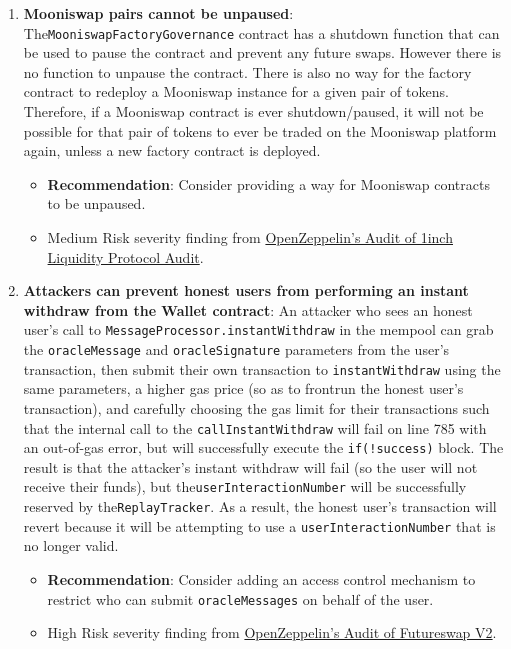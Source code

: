 \begin{enumerate}
\item\textbf{Mooniswap pairs cannot be unpaused}: The\linebreak\verb|MooniswapFactoryGovernance| contract has a shutdown function that can be used to pause the contract and prevent any future swaps. However there is no function to unpause the contract. There is also no way for the factory contract to redeploy a Mooniswap instance for a given pair of tokens. Therefore, if a Mooniswap contract is ever shutdown/paused, it will not be possible for that pair of tokens to ever be traded on the Mooniswap platform again, unless a new factory contract is deployed.
	\begin{itemize}
	\item\textbf{Recommendation}: Consider providing a way for Mooniswap contracts to be unpaused.
	\item Medium Risk severity finding from \href{https://blog.openzeppelin.com/1inch-liquidity-protocol-audit/}{OpenZeppelin’s Audit of 1inch Liquidity Protocol Audit}.
	\end{itemize}

\item\textbf{Attackers can prevent honest users from performing an instant withdraw from the Wallet contract}: An attacker who sees an honest user’s call to \verb|MessageProcessor.instantWithdraw| in the mempool can grab the \verb|oracleMessage| and \verb|oracleSignature| parameters from the user’s transaction, then submit their own transaction to \verb|instantWithdraw| using the same parameters, a higher gas price (so as to frontrun the honest user’s transaction), and carefully choosing the gas limit for their transactions such that the internal call to the \verb|callInstantWithdraw| will fail on line 785 with an out-of-gas error, but will successfully execute the \verb|if(!success)| block. The result is that the attacker’s instant withdraw will fail (so the user will not receive their funds), but the\linebreak\verb|userInteractionNumber| will be successfully reserved by the\linebreak\verb|ReplayTracker|. As a result, the honest user’s transaction will revert because it will be attempting to use a \verb|userInteractionNumber| that is no longer valid.
	\begin{itemize}
	\item\textbf{Recommendation}: Consider adding an access control mechanism to restrict who can submit \verb|oracleMessages| on behalf of the user.
	\item High Risk severity finding from \href{https://blog.openzeppelin.com/futureswap-v2-audit/}{OpenZeppelin’s Audit of Futureswap V2}.
	\end{itemize}


\end{enumerate}

